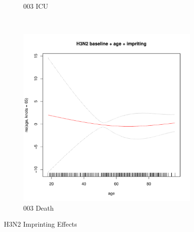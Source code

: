 \documentclass[12pt,twoside]{article}
\begin{document}
\begin{figure}[h]
{\begin{subfigure}{.49\linewidth}
                \caption{003 ICU}
        \end{subfigure}\\
        \begin{subfigure}{.49\linewidth}
                \includegraphics[width=\textwidth, page=2]{003Death_H3N2}
                \caption{003 Death}
        \end{subfigure}

        }
        \caption{H3N2 Imprinting Effects}\label{reduced}
    \end{figure}
    
    
    
\end{document}
